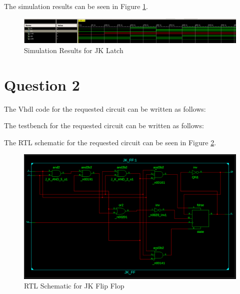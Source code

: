 \documentclass[table ]{article}
\begin{document}
The simulation results can be seen in Figure \ref{fig:jk_latch_sim}.

\begin{figure}[H]
    \centering
    \includegraphics[width=\textwidth]{img/1/sim.png}
    \caption{Simulation Results for JK Latch}
    \label{fig:jk_latch_sim}
\end{figure}


\section*{Question 2}

The Vhdl code for the requested circuit can be written as follows:


\begin{center} %
    \lstset{
  caption= JK\_FF.vhd, 
  basicstyle=\footnotesize, frame=tb,
  xleftmargin=.2\textwidth, xrightmargin=.2\textwidth
}
    
\end{center}

The testbench for the requested circuit can be written as follows:


\begin{center} %
    \lstset{
  caption= JK\_FF\_tb.vhd, 
  basicstyle=\footnotesize, frame=tb,
  xleftmargin=.2\textwidth, xrightmargin=.2\textwidth
}
    

\end{center}

The RTL schematic for the requested circuit can be seen in Figure \ref{fig:jk_ff_rtl}.

\begin{figure}[H]
    \centering
    \includegraphics[width=\textwidth]{img/2/rtl.png}
    \caption{RTL Schematic for JK Flip Flop}
    \label{fig:jk_ff_rtl}

\end{figure}
\end{document}
